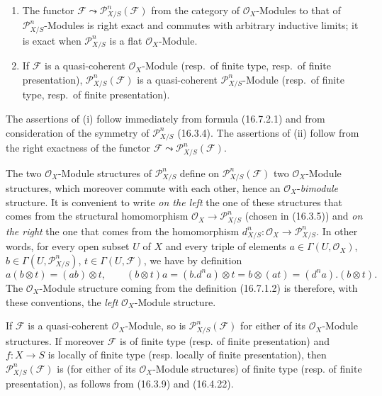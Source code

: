 \begin{proposition}[16.7.3]
\label{IV.16.7.3}
\begin{enumerate}
\item[\textup{(i)}] The functor
$\mathscr{F}\leadsto\mathscr{P}_{X/S}^n(\mathscr{F})$ from the category of
$\mathcal{O}_X$-Modules to that of $\mathscr{P}_{X/S}^n$-Modules is
right exact and commutes with arbitrary inductive limits; it is exact
when $\mathscr{P}_{X/S}^n$ is a flat $\mathcal{O}_X$-Module.
\item[\textup{(ii)}] If $\mathscr{F}$ is a quasi-coherent $\mathcal{O}_X$-Module
\textup{(resp.}\ of finite type, \textup{resp.}\ of finite presentation\textup{)},
$\mathscr{P}_{X/S}^n(\mathscr{F})$ is a quasi-coherent
$\mathscr{P}_{X/S}^n$-Module \textup{(resp.}\ of finite type, \textup{resp.}\ of finite
presentation\textup{)}.
\end{enumerate}
\end{proposition}

The assertions of (i) follow immediately from formula (16.7.2.1) and from
consideration of the symmetry of $\mathscr{P}_{X/S}^n$ (16.3.4). The
assertions of (ii) follow from the right exactness of the functor
$\mathscr{F}\leadsto\mathscr{P}_{X/S}^n(\mathscr{F})$.

\begin{env}[16.7.4]
\label{IV.16.7.4}
The two $\mathcal{O}_X$-Module structures of $\mathscr{P}_{X/S}^n$
define on $\mathscr{P}_{X/S}^n(\mathscr{F})$ two
$\mathcal{O}_X$-Module structures, which moreover commute with each other,
hence an $\mathcal{O}_X$-\emph{bimodule} structure. It is convenient to write
\emph{on the left} the one of these structures that comes from the structural
homomorphism $\mathcal{O}_X\to\mathscr{P}_{X/S}^n$ (chosen in (16.3.5)) and
\emph{on the right} the one that comes from the homomorphism
$d_{X/S}^n:\mathcal{O}_X\to\mathscr{P}_{X/S}^n$. In other words, for every
open subset $U$ of $X$ and every triple of elements
$a\in\Gamma(U,\mathcal{O}_X)$, $b\in\Gamma(U,\mathscr{P}_{X/S}^n)$,
$t\in\Gamma(U,\mathscr{F})$, we have by definition
\[
  a(b\otimes t)=(ab)\otimes t,\qquad
  (b\otimes t)a=(b.d^na)\otimes t=b\otimes(at)
  =(d^na).(b\otimes t).
  \tag{16.7.4.1}
  \label{IV.16.7.4.1}
\]
The $\mathcal{O}_X$-Module structure coming from the definition (16.7.1.2)
is therefore, with these conventions, the \emph{left} $\mathcal{O}_X$-Module
structure.

If $\mathscr{F}$ is a quasi-coherent $\mathcal{O}_X$-Module, so is
$\mathscr{P}_{X/S}^n(\mathscr{F})$ for either of its
$\mathcal{O}_X$-Module structures. If moreover $\mathscr{F}$ is of finite
type (resp. of finite presentation) and $f:X\to S$ is locally of finite type
(resp. locally of finite presentation), then
$\mathscr{P}_{X/S}^n(\mathscr{F})$ is (for either of its
$\mathcal{O}_X$-Module structures) of finite type (resp. of finite
presentation), as follows from (16.3.9) and (16.4.22).
\end{env}


